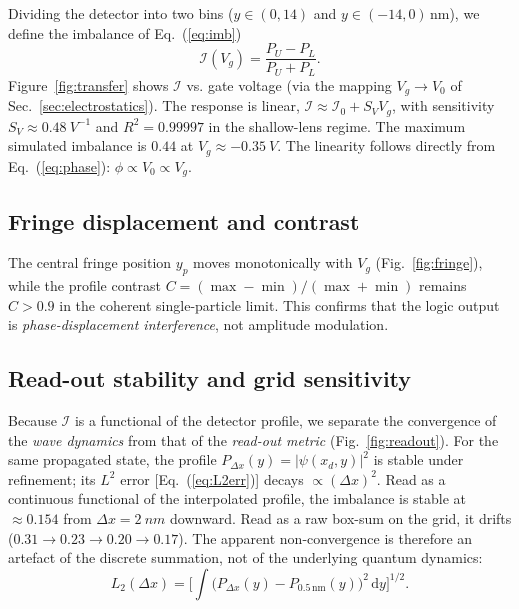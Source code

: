 \documentclass[11pt,a4paper]{article}
\newcommand{\dd}{\mathrm{d}}
\begin{document}
Dividing the detector into two bins ($y\in(0,14)$ and $y\in(-14,0)\,$nm), we 
define the imbalance of Eq.~(\ref{eq:imb})
\begin{equation}
\mathcal{I}(V_g) = \frac{P_U - P_L}{P_U + P_L}.
\label{eq:imb}
\end{equation}
Figure~\ref{fig:transfer} shows $\mathcal{I}$ vs. gate voltage (via the 
mapping $V_g\to V_0$ of Sec.~\ref{sec:electrostatics}). The response is 
linear, $\mathcal{I}\approx \mathcal{I}_0 + S_V V_g$, with sensitivity 
$S_V\approx\SI{0.48}{V^{-1}}$ and $R^2=0.99997$ in the shallow-lens regime. 
The maximum simulated imbalance is $0.44$ at $V_g\approx\SI{-0.35}{V}$. The 
linearity follows directly from Eq.~(\ref{eq:phase}): $\phi\propto V_0\propto V_g$.

\subsection{Fringe displacement and contrast}
\label{sec:fringe}

The central fringe position $y_p$ moves monotonically with $V_g$ 
(Fig.~\ref{fig:fringe}), while the profile contrast 
$C=(\max-\min)/(\max+\min)$ remains $C>0.9$ in the coherent single-particle 
limit. This confirms that the logic output is \emph{phase-displacement 
interference}, not amplitude modulation.

\subsection{Read-out stability and grid sensitivity}
\label{sec:readout}

Because $\mathcal{I}$ is a functional of the detector profile, we separate 
the convergence of the \emph{wave dynamics} from that of the \emph{read-out 
metric} (Fig.~\ref{fig:readout}). For the same propagated state, the profile 
$P_{\Delta x}(y)=|\psi(x_d,y)|^2$ is stable under refinement; its $L^2$ error 
[Eq.~(\ref{eq:L2err})] decays $\propto(\Delta x)^2$. Read as a continuous 
functional of the interpolated profile, the imbalance is stable at 
$\approx 0.154$ from $\Delta x=\SI{2}{nm}$ downward. Read as a raw box-sum on 
the grid, it drifts ($0.31\to0.23\to0.20\to0.17$). The apparent 
non-convergence is therefore an artefact of the discrete summation, not of 
the underlying quantum dynamics:
\begin{equation}
L_2(\Delta x) = \Big[\int\!\big(P_{\Delta x}(y)-P_{0.5\,\text{nm}}(y)\big)^2\,
\dd y\Big]^{1/2}.
\label{eq:L2err}
\end{equation}
\end{document}
